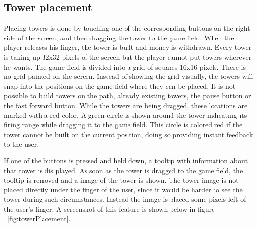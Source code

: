 \subsection{Tower placement}

Placing towers is done by touching one of the corresponding buttons on the right side of the screen, and then dragging the tower to the game field. When the player releases his finger, the tower is built and money is withdrawn. Every tower is taking up 32x32 pixels of the screen but the player cannot put towers wherever he wants. The game field is divided into a grid of squares 16x16 pixels. There is no grid painted on the screen. Instead of showing the grid visually, the towers will snap into the positions on the game field where they can be placed. It is not possible to build towers on the path, already existing towers, the pause button or the fast forward button. While the towers are being dragged, these locations are marked with a red color. A green circle is shown around the tower indicating its firing range while dragging it to the game field. This circle is colored red if the tower cannot be built on the current position, doing so providing instant feedback to the user.

If one of the buttons is pressed and held down, a tooltip with information about that tower is dis played. As soon as the tower is dragged to the game field, the tooltip is removed and a image of the tower is shown. The tower image is not placed directly under the finger of the user, since it would be harder to see the tower during such circumstances. Instead the image is placed some pixels left of the user's finger. A screenshot of this feature is shown below in figure ~\ref{fig:towerPlacement}.

